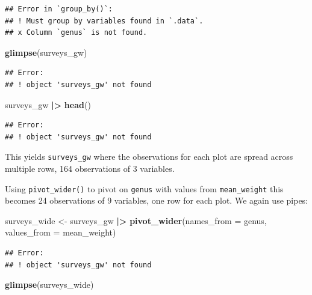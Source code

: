 \documentclass[
  10pt,
  letterpaper,
  twoside,
  openright]{book}
\newenvironment{Shaded}{\begin{snugshade}}{\end{snugshade}}
\newcommand{\AttributeTok}[1]{\textcolor[rgb]{0.13,0.29,0.53}{#1}}
\newcommand{\FunctionTok}[1]{\textcolor[rgb]{0.13,0.29,0.53}{\textbf{#1}}}
\newcommand{\NormalTok}[1]{#1}
\newcommand{\OtherTok}[1]{\textcolor[rgb]{0.56,0.35,0.01}{#1}}
\newcommand{\SpecialCharTok}[1]{\textcolor[rgb]{0.81,0.36,0.00}{\textbf{#1}}}
\begin{document}
\begin{verbatim}
## Error in `group_by()`:
## ! Must group by variables found in `.data`.
## x Column `genus` is not found.
\end{verbatim}

\begin{Shaded}
\begin{Highlighting}[]
\FunctionTok{glimpse}\NormalTok{(surveys\_gw)}
\end{Highlighting}
\end{Shaded}

\begin{verbatim}
## Error:
## ! object 'surveys_gw' not found
\end{verbatim}

\begin{Shaded}
\begin{Highlighting}[]
\NormalTok{surveys\_gw }\SpecialCharTok{|\textgreater{}} 
  \FunctionTok{head}\NormalTok{()}
\end{Highlighting}
\end{Shaded}

\begin{verbatim}
## Error:
## ! object 'surveys_gw' not found
\end{verbatim}

This yields \texttt{surveys\_gw} where the observations for each plot
are spread across multiple rows, 164 observations of 3 variables.

Using \texttt{pivot\_wider()} to pivot on \texttt{genus} with values
from \texttt{mean\_weight} this becomes 24 observations of 9 variables,
one row for each plot. We again use pipes:

\begin{Shaded}
\begin{Highlighting}[]
\NormalTok{surveys\_wide }\OtherTok{\textless{}{-}}\NormalTok{ surveys\_gw }\SpecialCharTok{|\textgreater{}}
  \FunctionTok{pivot\_wider}\NormalTok{(}\AttributeTok{names\_from =}\NormalTok{ genus, }\AttributeTok{values\_from =}\NormalTok{ mean\_weight)}
\end{Highlighting}
\end{Shaded}

\begin{verbatim}
## Error:
## ! object 'surveys_gw' not found
\end{verbatim}

\begin{Shaded}
\begin{Highlighting}[]
\FunctionTok{glimpse}\NormalTok{(surveys\_wide)}
\end{Highlighting}
\end{Shaded}
\end{document}
